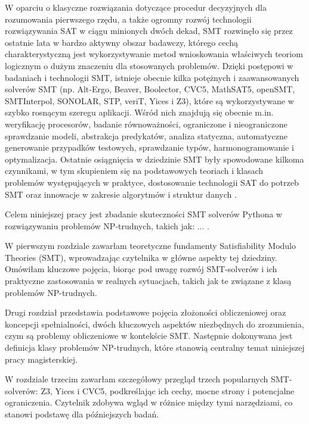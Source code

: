 \documentclass[xodstep]{wnspt}
\begin{document}
W oparciu o klasyczne rozwiązania dotyczące procedur decyzyjnych dla rozumowania pierwszego rzędu, a także ogromny rozwój technologii rozwiązywania SAT w ciągu minionych dwóch dekad,
SMT rozwinęło się przez ostatnie lata w bardzo aktywny obszar badawczy, którego cechą charakterystyczną jest wykorzystywanie metod wnioskowania właściwych teoriom logicznym o dużym znaczeniu dla stosowanych problemów.
Dzięki postępowi w badaniach i technologii SMT, istnieje obecnie kilka potężnych i zaawansowanych solverów SMT (np. Alt-Ergo, Beaver, Boolector, CVC5, MathSAT5, openSMT, SMTInterpol, SONOLAR, STP, veriT, Yices i Z3), które są wykorzystywane w szybko rosnącym szeregu aplikacji. Wśród nich znajdują się obecnie m.in. weryfikację procesorów, badanie równoważności, ograniczone i nieograniczone sprawdzanie modeli, abstrakcja predykatów, analiza statyczna, automatyczne generowanie przypadków testowych, sprawdzanie typów, harmonogramowanie i optymalizacja.
Ostatnie osiągnięcia w dziedzinie SMT były spowodowane kilkoma czynnikami, w tym skupieniem się na podstawowych teoriach i klasach problemów występujących w praktyce, dostosowanie technologii SAT do potrzeb SMT oraz innowacje w zakresie algorytmów i struktur danych \cite{Clarke18}.

Celem niniejszej pracy jest zbadanie skuteczności SMT solverów Pythona w rozwiązywaniu problemów NP-trudnych, takich jak: ... .

W pierwszym rozdziale zawarłam teoretyczne fundamenty Satisfiability Modulo Theories (SMT), wprowadzając czytelnika w główne aspekty tej dziedziny. Omówiłam kluczowe pojęcia, biorąc pod uwagę rozwój SMT-solverów i ich praktyczne zastosowania w realnych sytuacjach, takich jak te związane z klasą problemów NP-trudnych.

Drugi rozdział przedstawia podstawowe pojęcia złożoności obliczeniowej oraz koncepcji spełnialności, dwóch kluczowych aspektów niezbędnych do zrozumienia, czym są problemy obliczeniowe w kontekście SMT. Następnie dokonywana jest definicja klasy problemów NP-trudnych, które stanowią centralny temat niniejszej pracy magisterskiej.

W rozdziale trzecim zawarłam szczegółowy przegląd trzech popularnych SMT-solverów: Z3, Yices i CVC5, podkreślając ich cechy, mocne strony i potencjalne ograniczenia. Czytelnik zdobywa wgląd w różnice między tymi narzędziami, co stanowi podstawę dla późniejszych badań.
\end{document}
